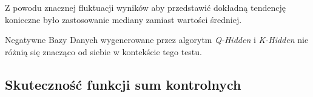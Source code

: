 Z powodu znacznej fluktuacji wyników aby przedstawić dokładną tendencję konieczne było zastosowanie mediany zamiast wartości średniej. 

Negatywne Bazy Danych wygenerowane przez algorytm \textit{Q-Hidden} i \textit{K-Hidden} nie różnią się znacząco od siebie w kontekście tego testu.

\subsection{Skuteczność funkcji sum kontrolnych}
